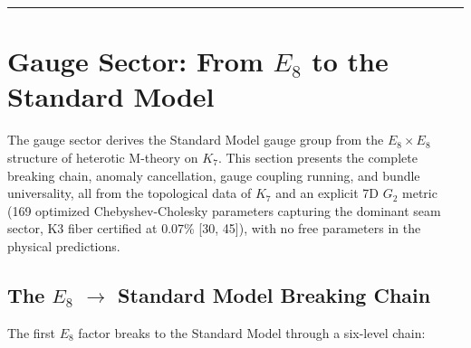 \documentclass[11pt,a4paper]{article}
\begin{document}
\noindent

\rule{\textwidth}{0.2pt}

\section{\texorpdfstring{Gauge Sector: From \(E_{8}\) to the Standard
Model}{Gauge Sector: From E\_\{8\} to the Standard Model}}\label{gauge-sector-from-e_8-to-the-standard-model}

The gauge sector derives the Standard Model gauge group from the
\(E_{8} \times E_{8}\) structure of heterotic M-theory on \(K_{7}\).
This section presents the complete breaking chain, anomaly cancellation,
gauge coupling running, and bundle universality, all from the
topological data of \(K_{7}\) and an explicit 7D \(G_{2}\) metric (169
optimized Chebyshev-Cholesky parameters capturing the dominant seam
sector, K3 fiber certified at 0.07\% {[}30, 45{]}), with no free
parameters in the physical predictions.

\subsection{\texorpdfstring{The \(E_{8}\) \(\to\) Standard Model
Breaking
Chain}{The E\_\{8\} \textbackslash to Standard Model Breaking Chain}}\label{the-e_8-to-standard-model-breaking-chain}

The first \(E_{8}\) factor breaks to the Standard Model through a
six-level chain:
\end{document}
